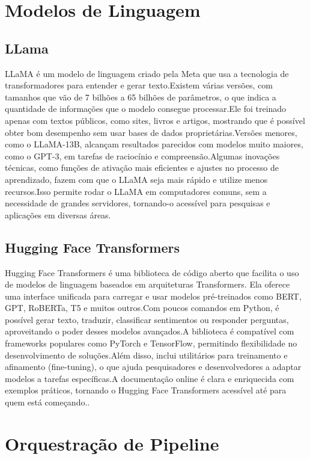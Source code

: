 \section{Modelos de Linguagem}
\subsection{LLama}
LLaMA é um modelo de linguagem criado pela Meta que usa a tecnologia de transformadores para entender e gerar texto.Existem várias versões, com tamanhos que vão de 7 bilhões a 65 bilhões de parâmetros, o que indica a quantidade de informações que o modelo consegue processar.Ele foi treinado apenas com textos públicos, como sites, livros e artigos, mostrando que é possível obter bom desempenho sem usar bases de dados proprietárias.Versões menores, como o LLaMA-13B, alcançam resultados parecidos com modelos muito maiores, como o GPT-3, em tarefas de raciocínio e compreensão.Algumas inovações técnicas, como funções de ativação mais eficientes e ajustes no processo de aprendizado, fazem com que o LLaMA seja mais rápido e utilize menos recursos.Isso permite rodar o LLaMA em computadores comuns, sem a necessidade de grandes servidores, tornando-o acessível para pesquisas e aplicações em diversas áreas.
\cite{touvron2023llama}


\subsection{Hugging Face Transformers}
Hugging Face Transformers é uma biblioteca de código aberto que facilita o uso de modelos de linguagem baseados em arquiteturas Transformers. Ela oferece uma interface unificada para carregar e usar modelos pré-treinados como BERT, GPT, RoBERTa, T5 e muitos outros.Com poucos comandos em Python, é possível gerar texto, traduzir, classificar sentimentos ou responder perguntas, aproveitando o poder desses modelos avançados.A biblioteca é compatível com frameworks populares como PyTorch e TensorFlow, permitindo flexibilidade no desenvolvimento de soluções.Além disso, inclui utilitários para treinamento e afinamento (fine-tuning), o que ajuda pesquisadores e desenvolvedores a adaptar modelos a tarefas específicas.A documentação online é clara e enriquecida com exemplos práticos, tornando o Hugging Face Transformers acessível até para quem está começando.\cite{huggingface2024transformers}.

\section{Orquestração de Pipeline}
